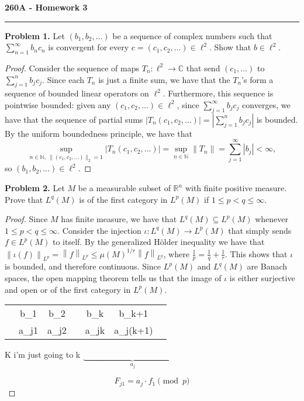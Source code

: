 \documentclass[11pt,letterpaper]{report}
\newcommand{\naturals}{\mathbb{N}}
\newcommand{\complex}{\mathbb{C}}
\newcommand{\reals}{\mathbb{R}}
\newcommand{\Lp}[2]{\left\|{#1}\right\|_{L^{#2}}}
\begin{document}
\begin{center}
{\bf \Large 260A - Homework 3} %
\vspace{0.2cm}
\hrule
\end{center}

\noindent\textbf{Problem 1. }
Let $(b_1, b_2, \ldots)$ be a sequence of complex numbers such that $\sum_{n=1}^\infty b_nc_n$ is convergent for every $c = (c_1, c_2, \ldots)\in \ell^2$. Show that $b\in \ell^2$.
\begin{proof}
	Consider the sequence of maps $T_n: \ell^2\to \complex$ that send $(c_1, \ldots)$ to $\sum_{j=1}^n b_jc_j$. Since each $T_n$ is just a finite sum, we have that the $T_n$'s form a sequence of bounded linear operators on $\ell^2$. Furthermore, this sequence is pointwise bounded: given any $(c_1, c_2, \ldots)\in \ell^2$, since $\sum_{j=1}^\infty b_jc_j$ converges, we have that the sequence of partial sums $|T_n(c_1, c_2, \ldots)| = |\sum_{j=1}^n b_jc_j|$ is bounded. By the uniform boundedness principle, we have that
	\[
	\sup_{n\in \naturals,\ \|(c_1, c_2, \ldots)\|_2 = 1}|T_n(c_1, c_2, \ldots)| = \sup_{n\in \naturals}\|T_n\| = \sum_{j=1}^\infty |b_j|<\infty,
	\]
	so $(b_1, b_2, \ldots)\in \ell^2$.
\end{proof}

\noindent\textbf{Problem 2. }
Let $M$ be a measurable subset of $\reals^n$ with finite positive measure. Prove that $L^q(M)$ is of the first category in $L^p(M)$ if $1\leq p<q\leq \infty$.
\begin{proof}
	Since $M$ has finite measure, we have that $L^q(M)\subseteq L^p(M)$ whenever $1\leq p<q\leq \infty$. Consider the injection $\iota: L^q(M)\to L^p(M)$ that simply sends $f\in L^p(M)$ to itself. By the generalized H\"older inequality we have that $\Lp{\iota(f)}{p} = \Lp{f}{p}\leq \mu(M)^{1/r}\Lp{f}{q}$, where $\frac{1}{p} = \frac{1}{q} + \frac{1}{r}$. This shows that $\iota$ is bounded, and therefore continuous. Since $L^p(M)$ and $L^q(M)$ are Banach spaces, the open mapping theorem tells us that the image of $\iota$ is either surjective and open or of the first category in $L^p(M)$.\\

	\noindent
	\begin{tabular}{L||C|C|C|C|C|C}
		 & b_1 & b_2 & \cdots & b_k & b_{k+1} & \cdots\\
		 & a_{j1} & a_{j2} & \cdots & a_{jk} & a_{j(k+1)} & \cdots
	\end{tabular}

	\noindent K i'm just going to k $\underbrace{\ \ \ \ \ \ \ \ \ \ \ \ \ \ \ \ \ \ \ \ \ \ \ \ \ \ \ \ \ \ \ \ \ \ \ \ \ \ \ \ \ \ \ \ \ \ \ \ \ \ \ \ \ \ \ }_{a_j}$

	\[
	F_{j1} = a_j\cdot f_1\pmod{p}
	\]
\end{proof}
\end{document}
